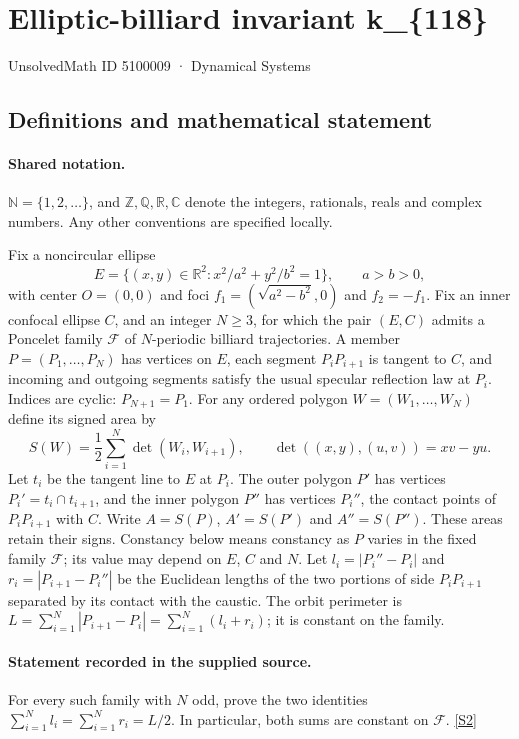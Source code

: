 \documentclass[11pt]{article}
\newcommand{\sref}[2]{\hyperlink{source:#1:#2}{[S#2]}}
\begin{document}
\setcounter{section}{5100008}
\section{Elliptic-billiard invariant k\_\{118\}}\label{5100009}
{\small\sffamily UnsolvedMath ID 5100009 · Dynamical Systems}
\subsection{Definitions and mathematical statement}

\paragraph{Shared notation.}$\mathbb N=\{1,2,\ldots\}$, and $\mathbb Z,\mathbb Q,\mathbb R,\mathbb C$ denote the integers, rationals, reals and complex numbers. Any other conventions are specified locally.


Fix a noncircular ellipse
\[
E=\{(x,y)\in\mathbb R^2:x^2/a^2+y^2/b^2=1\},\qquad a>b>0,
\]
with center $O=(0,0)$ and foci $f_1=(\sqrt{a^2-b^2},0)$ and $f_2=-f_1$. Fix an inner confocal ellipse $C$, and an integer $N\geq3$, for which the pair $(E,C)$ admits a Poncelet family $\mathcal F$ of $N$-periodic billiard trajectories. A member $P=(P_1,\ldots,P_N)$ has vertices on $E$, each segment $P_iP_{i+1}$ is tangent to $C$, and incoming and outgoing segments satisfy the usual specular reflection law at $P_i$. Indices are cyclic: $P_{N+1}=P_1$.
For any ordered polygon $W=(W_1,\ldots,W_N)$ define its signed area by
\[
S(W)=\frac12\sum_{i=1}^N\det(W_i,W_{i+1}),\qquad
\det((x,y),(u,v))=xv-yu.
\]
Let $t_i$ be the tangent line to $E$ at $P_i$. The outer polygon $P'$ has vertices $P_i'=t_i\cap t_{i+1}$, and the inner polygon $P''$ has vertices $P_i''$, the contact points of $P_iP_{i+1}$ with $C$. Write $A=S(P)$, $A'=S(P')$ and $A''=S(P'')$. These areas retain their signs. Constancy below means constancy as $P$ varies in the fixed family $\mathcal F$; its value may depend on $E$, $C$ and $N$.
Let $l_i=|P_i''-P_i|$ and $r_i=|P_{i+1}-P_i''|$ be the Euclidean lengths of the two portions of side $P_iP_{i+1}$ separated by its contact with the caustic. The orbit perimeter is $L=\sum_{i=1}^N|P_{i+1}-P_i|=\sum_{i=1}^N(l_i+r_i)$; it is constant on the family.
\paragraph{Statement recorded in the supplied source.}
For every such family with $N$ odd, prove the two identities $\displaystyle\sum_{i=1}^N l_i=\sum_{i=1}^N r_i=L/2$. In particular, both sums are constant on $\mathcal F$. \sref{5100009}{2}
\end{document}
